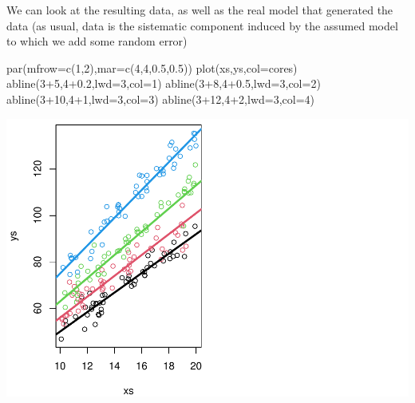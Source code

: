 \documentclass[
]{book}
\newenvironment{Shaded}{\begin{snugshade}}{\end{snugshade}}
\newcommand{\AttributeTok}[1]{\textcolor[rgb]{0.77,0.63,0.00}{#1}}
\newcommand{\DecValTok}[1]{\textcolor[rgb]{0.00,0.00,0.81}{#1}}
\newcommand{\FloatTok}[1]{\textcolor[rgb]{0.00,0.00,0.81}{#1}}
\newcommand{\FunctionTok}[1]{\textcolor[rgb]{0.00,0.00,0.00}{#1}}
\newcommand{\NormalTok}[1]{#1}
\newcommand{\SpecialCharTok}[1]{\textcolor[rgb]{0.00,0.00,0.00}{#1}}
\begin{document}
We can look at the resulting data, as well as the real model that generated the data (as usual, data is the sistematic component induced by the assumed model to which we add some random error)

\begin{Shaded}
\begin{Highlighting}[]
\FunctionTok{par}\NormalTok{(}\AttributeTok{mfrow=}\FunctionTok{c}\NormalTok{(}\DecValTok{1}\NormalTok{,}\DecValTok{2}\NormalTok{),}\AttributeTok{mar=}\FunctionTok{c}\NormalTok{(}\DecValTok{4}\NormalTok{,}\DecValTok{4}\NormalTok{,}\FloatTok{0.5}\NormalTok{,}\FloatTok{0.5}\NormalTok{))}
\FunctionTok{plot}\NormalTok{(xs,ys,}\AttributeTok{col=}\NormalTok{cores)}
\FunctionTok{abline}\NormalTok{(}\DecValTok{3}\SpecialCharTok{+}\DecValTok{5}\NormalTok{,}\DecValTok{4}\FloatTok{+0.2}\NormalTok{,}\AttributeTok{lwd=}\DecValTok{3}\NormalTok{,}\AttributeTok{col=}\DecValTok{1}\NormalTok{)}
\FunctionTok{abline}\NormalTok{(}\DecValTok{3}\SpecialCharTok{+}\DecValTok{8}\NormalTok{,}\DecValTok{4}\FloatTok{+0.5}\NormalTok{,}\AttributeTok{lwd=}\DecValTok{3}\NormalTok{,}\AttributeTok{col=}\DecValTok{2}\NormalTok{)}
\FunctionTok{abline}\NormalTok{(}\DecValTok{3}\SpecialCharTok{+}\DecValTok{10}\NormalTok{,}\DecValTok{4}\SpecialCharTok{+}\DecValTok{1}\NormalTok{,}\AttributeTok{lwd=}\DecValTok{3}\NormalTok{,}\AttributeTok{col=}\DecValTok{3}\NormalTok{)}
\FunctionTok{abline}\NormalTok{(}\DecValTok{3}\SpecialCharTok{+}\DecValTok{12}\NormalTok{,}\DecValTok{4}\SpecialCharTok{+}\DecValTok{2}\NormalTok{,}\AttributeTok{lwd=}\DecValTok{3}\NormalTok{,}\AttributeTok{col=}\DecValTok{4}\NormalTok{)}
\end{Highlighting}
\end{Shaded}

\includegraphics{ECOMODbook_files/figure-latex/a11.6-1.pdf}
\end{document}

